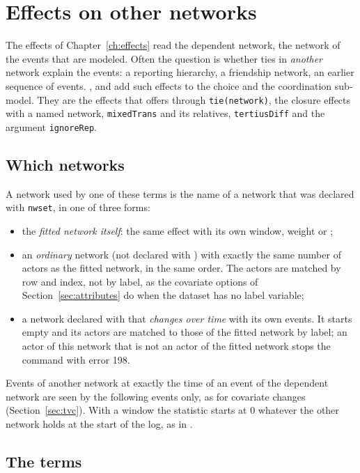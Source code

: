 \chapter{Effects on other networks}\label{ch:netterms}

The effects of Chapter~\ref{ch:effects} read the dependent network, the network of the events that are modeled. Often the question is whether ties in \emph{another} network explain the events: a reporting hierarchy, a friendship network, an earlier sequence of events. ,  and  add such effects to the choice and the coordination sub-model. They are the effects that \goldfish{} offers through \texttt{tie(network)}, the closure effects with a named network, \texttt{mixedTrans} and its relatives, \texttt{tertiusDiff} and the argument \texttt{ignoreRep}.

\section{Which networks}\label{sec:whichnets}

A network used by one of these terms is the name of a network that was declared with \texttt{nwset}, in one of three forms:
\begin{itemize}[nosep]
  \item the \emph{fitted network itself}: the same effect with its own window, weight or ;
  \item an \emph{ordinary} network (not declared with ) with exactly the same number of actors as the fitted network, in the same order. The actors are matched by row and index, not by label, as the covariate options of Section~\ref{sec:attributes} do when the dataset has no label variable;
  \item a network declared with  that \emph{changes over time} with its own events. It starts empty and its actors are matched to those of the fitted network by label; an actor of this network that is not an actor of the fitted network stops the command with error 198.
\end{itemize}
Events of another network at exactly the time of an event of the dependent network are seen by the following events only, as for covariate changes (Section~\ref{sec:tvc}). With a window the statistic starts at 0 whatever the other network holds at the start of the log, as in \goldfish{}.

\section{The terms}


